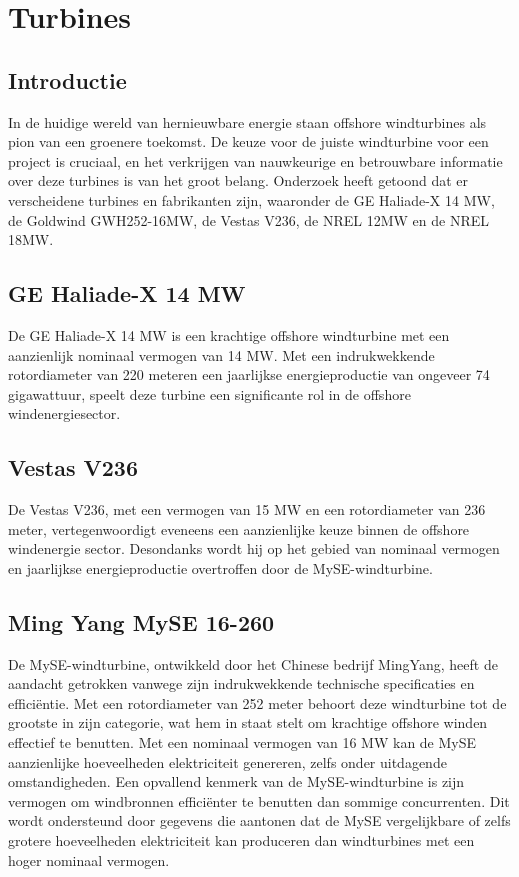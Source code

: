 
\section{Turbines}
\subsection{Introductie}
In de huidige wereld van hernieuwbare energie staan offshore windturbines als pion van een groenere toekomst. De keuze voor de juiste windturbine voor een project is cruciaal, en het verkrijgen van nauwkeurige en betrouwbare informatie over deze turbines is van het groot belang. Onderzoek heeft getoond dat er verscheidene turbines en fabrikanten zijn, waaronder de GE Haliade-X 14 MW, de Goldwind GWH252-16MW, de Vestas V236, de NREL 12MW en de NREL 18MW.
\subsection{GE Haliade-X 14 MW}
De GE Haliade-X 14 MW is een krachtige offshore windturbine met een aanzienlijk nominaal vermogen van 14 MW. Met een indrukwekkende rotordiameter van 220 meteren een jaarlijkse energieproductie van ongeveer 74 gigawattuur, speelt deze turbine een significante rol in de offshore windenergiesector. \cite{GEHalideX}\cite{TNOHalideX}\cite{TopsectorEnergieHalideX}\cite{OffshoreWindHalideX}\cite{AandrijftechniekHalideX}\cite{PonderaHalideX}
\subsection{Vestas V236}
De Vestas V236, met een vermogen van 15 MW en een rotordiameter van 236 meter, vertegenwoordigt eveneens een aanzienlijke keuze binnen de offshore windenergie sector. Desondanks wordt hij op het gebied van nominaal vermogen en jaarlijkse energieproductie overtroffen door de MySE-windturbine. \cite{Vestas15MW}\cite{Vestas}\cite{VestasJourney}\cite{WindTurbineModels}\cite{Electrek}\cite{OffshoreWindBiz3}
\subsection{Ming Yang MySE 16-260}
De MySE-windturbine, ontwikkeld door het Chinese bedrijf MingYang, heeft de aandacht getrokken vanwege zijn indrukwekkende technische specificaties en efficiëntie. Met een rotordiameter van 252 meter behoort deze windturbine tot de grootste in zijn categorie, wat hem in staat stelt om krachtige offshore winden effectief te benutten. Met een nominaal vermogen van 16 MW kan de MySE aanzienlijke hoeveelheden elektriciteit genereren, zelfs onder uitdagende omstandigheden.
Een opvallend kenmerk van de MySE-windturbine is zijn vermogen om windbronnen efficiënter te benutten dan sommige concurrenten. Dit wordt ondersteund door gegevens die aantonen dat de MySE vergelijkbare of zelfs grotere hoeveelheden elektriciteit kan produceren dan windturbines met een hoger nominaal vermogen.\cite{NewAtlas}\cite{MySEWebsite}\cite{OffshoreWindMySE}\cite{YouTube}\cite{MySEWebsite2}
